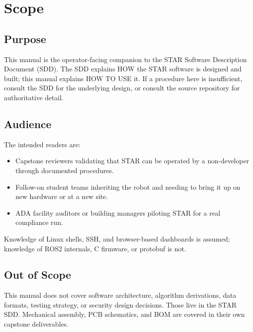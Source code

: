 \documentclass[11pt,letterpaper]{article}
\begin{document}
\setcounter{page}{1}
\tableofcontents
\clearpage
\listoffigures
\listoftables
\clearpage

\setcounter{page}{1}

\section{Scope}
\label{sec:scope}

\subsection{Purpose}
This manual is the operator-facing companion to the STAR Software
Description Document (SDD). The SDD explains HOW the STAR software is
designed and built; this manual explains HOW TO USE it. If a procedure
here is insufficient, consult the SDD for the underlying design, or
consult the source repository for authoritative detail.

\subsection{Audience}
The intended readers are:
\begin{itemize}[leftmargin=1.4em,itemsep=2pt]
\item Capstone reviewers validating that STAR can be operated by a
      non-developer through documented procedures.
\item Follow-on student teams inheriting the robot and needing to
      bring it up on new hardware or at a new site.
\item ADA facility auditors or building managers piloting STAR for a
      real compliance run.
\end{itemize}
Knowledge of Linux shells, SSH, and browser-based dashboards is
assumed; knowledge of ROS2 internals, C firmware, or protobuf is not.

\subsection{Out of Scope}
This manual does not cover software architecture, algorithm
derivations, data formats, testing strategy, or security design
decisions. Those live in the STAR SDD. Mechanical assembly, PCB
schematics, and BOM are covered in their own capstone deliverables.
\end{document}
